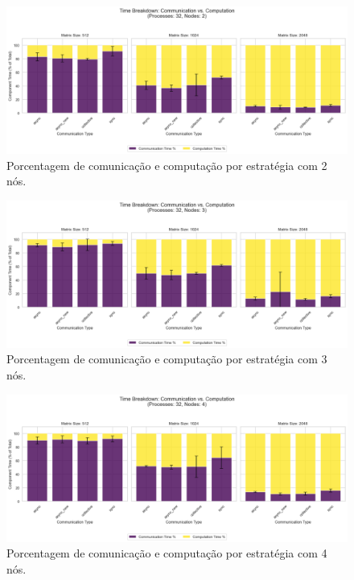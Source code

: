 \documentclass{article}
\begin{document}
\begin{figure}[H]
    \centering
    \includegraphics[width=1\linewidth]{images/comp_time_2nodes.png}
    \caption{Porcentagem de comunicação e computação por estratégia com 2 nós.}
    \label{fig:comp_time_2}
\end{figure}

\begin{figure}[H]
    \centering
    \includegraphics[width=1\linewidth]{images/comp_time_3nodes.png}
    \caption{Porcentagem de comunicação e computação por estratégia com 3 nós.}
    \label{fig:comp_time_3}
\end{figure}

\begin{figure}[H]
    \centering
    \includegraphics[width=1\linewidth]{images/comp_time_4nodes.png}
    \caption{Porcentagem de comunicação e computação por estratégia com 4 nós.}
    \label{fig:comp_time_4}
\end{figure}
\end{document}
